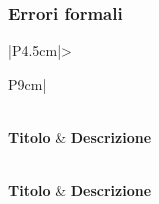 \subsubsection{Errori formali}

\bgroup
\begin{adjustwidth}{-0.5cm}{-0.5cm}
  \begin{longtable}{|P{4.5cm}|>{\raggedright\arraybackslash}P{9cm}|}
    \caption{Checklist - Errori formali}
  	\label{tab:check-errori-formali} \\
    \hline
		\textbf{Titolo} & \textbf{Descrizione} \\ 
		\hline
		\endfirsthead

    \caption[]{Checklist - Errori formali (continua)} \\
		\hline
		\textbf{Titolo} & \textbf{Descrizione} \\ 
		\hline
		\endhead

		\hline
		 \\ 
		\hline
		\endfoot

		\hline
		\endlastfoot


\end{longtable}
\end{adjustwidth}
